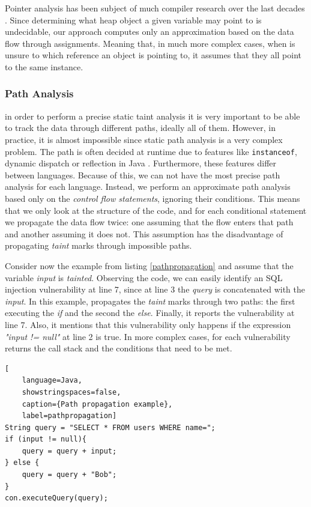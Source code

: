 Pointer analysis has been subject of much compiler research over the last decades \cite{spath2016boomerang,hind2001pointer}. Since determining what heap object a given variable may point to is undecidable, our approach computes only an approximation based on the data flow through assignments. Meaning that, in much more complex cases, when \toolname{} is unsure to which reference an object is pointing to, it assumes that they all point to the same instance.


\subsubsection{Path Analysis} in order to perform a precise static taint analysis it is very important to be able to track the data through different paths, ideally all of them. However, in practice, it is almost impossible since static path analysis is a very complex problem. The path is often decided at runtime due to features like \texttt{instanceof}, dynamic dispatch or reflection in Java \cite{hammer2008static}. Furthermore, these features differ between languages. Because of this, we can not have the most precise path analysis for each language. Instead, we perform an approximate path analysis based only on the \textit{control flow statements}, ignoring their conditions. This means that we only look at the structure of the code, and for each conditional statement we propagate the data flow twice: one assuming that the flow enters that path and another assuming it does not. This assumption has the disadvantage of propagating \textit{taint} marks through impossible paths.

Consider now the example from listing \ref{pathpropagation} and assume that the variable \textit{input} is \textit{tainted}. Observing the code, we can easily identify an SQL injection vulnerability at line 7, since at line 3 the \textit{query} is concatenated with the \textit{input}.
In this example, \toolname{} propagates the \textit{taint} marks through two paths: the first executing the \textit{if} and the second the \textit{else}. Finally, it reports the vulnerability at line 7. Also, it mentions that this vulnerability only happens if the expression \textit{"input != null"} at line 2 is true. In more complex cases, for each vulnerability \toolname{} returns the call stack and the conditions that need to be met.

\begin{lstlisting}[
    language=Java,
    showstringspaces=false,
    caption={Path propagation example},
    label=pathpropagation] 
String query = "SELECT * FROM users WHERE name=";
if (input != null){
    query = query + input;
} else {
    query = query + "Bob";
}
con.executeQuery(query);
\end{lstlisting}

